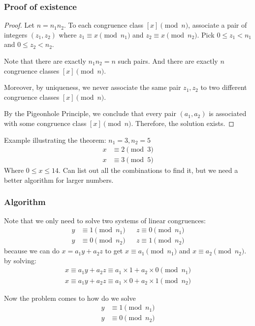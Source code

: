 \documentclass[letterpaper,12pt,oneside]{article}
\begin{document}
\subsubsection{Proof of existence}
\begin{proof}
    Let $n=n_1 n_2$. To each congruence class $[x] \pmod n$, associate a pair of integers $(z_1,z_2)$ where $z_1\equiv x \pmod {n_1}$ and $z_2\equiv x \pmod {n_2}$. Pick $0\le z_1 < n_1$ and $0\le z_2 < n_2$.

    Note that there are exactly $n_1 n_2=n$ such pairs. And there are exactly $n$
    congruence classes $[x] \pmod n$.

    Moreover, by uniqueness, we never associate the same pair $z_1, z_2$ to two
    different congruence classes $[x] \pmod n$.

    By the Pigeonhole Principle, we conclude that every pair $(a_1,a_2)$ is
    associated with some congruence class $[x] \pmod n$. Therefore, the solution
    exists.
\end{proof}
Example illustrating the theorem: $n_1=3,n_2=5$ \begin{align*}
    x & \equiv 2 \pmod 3 \\
    x & \equiv 3 \pmod 5
\end{align*}
Where $0\le x\le 14$. Can list out all the combinations to find it, but we need a better algorithm for larger numbers.
\subsubsection{Algorithm}
Note that we only need to solve two systems of linear congruences: \begin{align*}
    y & \equiv 1 \pmod {n_1} &  & z \equiv 0 \pmod {n_1} \\
    y & \equiv 0 \pmod {n_2} &  & z \equiv 1 \pmod {n_2}
\end{align*}
because we can do $x=a_1 y+a_2 z$ to get $x\equiv a_1 \pmod {n_1}$ and $x\equiv a_2 \pmod {n_2}$. by solving:
\begin{align*}
    x\equiv a_1y+a_2 z \equiv a_1 \times 1 + a_2 \times 0 \pmod {n_1} \\
    x\equiv a_1y+a_2 z \equiv a_1 \times 0 + a_2 \times 1 \pmod {n_2}
\end{align*}


Now the problem comes to how do we solve \begin{align*}
    y & \equiv 1 \pmod {n_1} \\
    y & \equiv 0 \pmod {n_2}
\end{align*}
\end{document}
